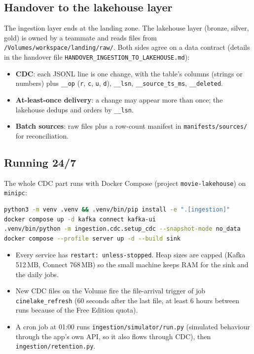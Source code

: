 \documentclass[12pt,a4paper]{article}
\newcommand{\code}[1]{\texttt{#1}}
\begin{document}
\subsection{Handover to the lakehouse layer}
The ingestion layer ends at the landing zone. The lakehouse layer (bronze, silver, gold) is owned by a teammate and
reads files from \code{/Volumes/workspace/landing/raw/}. Both sides agree on a data contract (details in the handover
file \code{HANDOVER\_INGESTION\_TO\_LAKEHOUSE.md}):
\begin{itemize}
  \item \textbf{CDC}: each JSONL line is one change, with the table's columns (strings or numbers) plus
        \code{\_\_op} (\code{r}, \code{c}, \code{u}, \code{d}), \code{\_\_lsn}, \code{\_\_source\_ts\_ms}, \code{\_\_deleted}.
  \item \textbf{At-least-once delivery}: a change may appear more than once; the lakehouse dedups and orders by
        \code{\_\_lsn}.
  \item \textbf{Batch sources}: raw files plus a row-count manifest in \code{manifests/sources/} for reconciliation.
\end{itemize}

\subsection{Running 24/7}
The whole CDC part runs with Docker Compose (project \code{movie-lakehouse}) on \code{minipc}:
\begin{lstlisting}[language=bash, caption={Setup on the server}]
python3 -m venv .venv && .venv/bin/pip install -e ".[ingestion]"
docker compose up -d kafka connect kafka-ui
.venv/bin/python -m ingestion.cdc.setup_cdc --snapshot-mode no_data
docker compose --profile server up -d --build sink
\end{lstlisting}
\begin{itemize}
  \item Every service has \code{restart: unless-stopped}. Heap sizes are capped (Kafka 512\,MB, Connect 768\,MB) so the
        small machine keeps RAM for the sink and the daily jobs.
  \item New CDC files on the Volume fire the file-arrival trigger of job \code{cinelake\_refresh}
        (60 seconds after the last file, at least 6 hours between runs because of the Free Edition quota).
  \item A cron job at 01:00 runs \code{ingestion/simulator/run.py} (simulated behaviour through the app's own API, so
        it also flows through CDC), then \code{ingestion/retention.py}.
\end{itemize}
\end{document}
